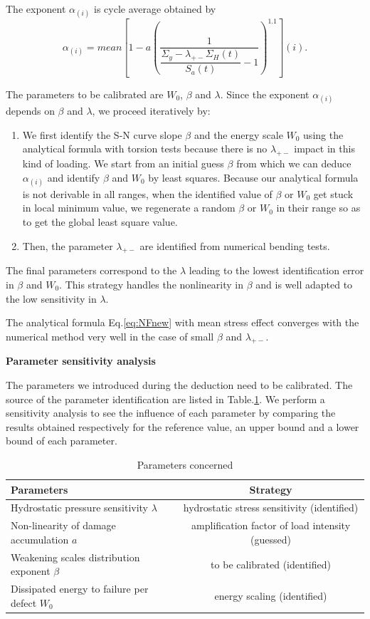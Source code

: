 The exponent $\alpha_{(i)}$ is cycle average obtained by $$\alpha_{(i)}=mean\left[1-a\left( \dfrac{1}{\dfrac{\Sigma_y-\lambda_{+-} \Sigma_{H}(t)}{S_{a}(t)}-1 } \right)^{1.1}\right] (i).$$

The parameters to be calibrated are $W_0$, $\beta$ and $\lambda$. Since the exponent $\alpha_{(i)}$ depends on $\beta$ and $\lambda$, we proceed iteratively by:

\begin{enumerate}
	\item We first identify the S-N curve slope $\beta$ and the energy scale $W_0$ using the analytical formula with torsion tests because there is no $\lambda_{+-}$ impact in this kind of loading. We start from an initial guess $\beta$ from which we can deduce $\alpha_{(i)}$ and identify $\beta$ and $W_0$ by least squares. Because our analytical formula is not derivable in all ranges, when the identified value of $\beta$ or $W_0$ get stuck in local minimum value, we regenerate a random $\beta$ or $W_0$ in their range so as to get the global least square value.
	\item Then, the parameter $\lambda_{+-}$ are identified from numerical bending tests.
\end{enumerate}

The final parameters correspond to the $\lambda$ leading to the lowest identification error in $\beta$ and $W_0$. This strategy handles the nonlinearity in $\beta$ and is well adapted to the low sensitivity in $\lambda$.

The analytical formula Eq.\eqref{eq:NFnew} with mean stress effect converges with the numerical method very well in the case of small $\beta$ and $\lambda_{+-}$. 


\textbf{Parameter sensitivity analysis}

The parameters we introduced during the deduction need to be calibrated. The source of the parameter identification are listed in Table.\ref{paras}.
We perform a sensitivity analysis to see the influence of each parameter by comparing the results obtained respectively for the reference value, an upper bound and a lower bound of each parameter.

\begin{table}[!h]
	\centering
	\begin{tabular}{l|c}
		\hline
		\textbf{Parameters}                                  & \multicolumn{1}{c}{\textbf{Strategy}} \\ \hline
		Hydrostatic pressure sensitivity $\lambda$           & hydrostatic stress sensitivity (identified)         \\
		Non-linearity of damage accumulation  $a$        & amplification factor of load intensity (guessed)     \\
		Weakening scales distribution exponent  $\beta$      & to be calibrated (identified)                   \\
		Dissipated energy to failure per defect  $W_0$ & energy scaling (identified)              \\ \hline
	\end{tabular}
	\caption{Parameters concerned}
	\label{paras}
\end{table}


